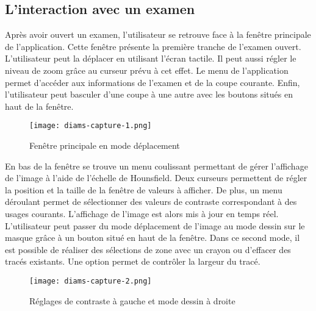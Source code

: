 \subsection{L'interaction avec un examen}

Après avoir ouvert un examen, l'utilisateur se retrouve face à la fenêtre principale de l'application. Cette fenêtre présente la première tranche de l'examen ouvert. L'utilisateur peut la déplacer en utilisant l'écran tactile. Il peut aussi régler le niveau de zoom grâce au curseur prévu à cet effet. 
Le menu de l'application permet d'accéder aux informations de l'examen et de la coupe courante. Enfin, l'utilisateur peut basculer d'une coupe à une autre avec les boutons situés en haut de la fenêtre.\\

\begin{figure}[h]
\begin{center}
	\texttt{[image: diams-capture-1.png]}
\end{center}
	\caption{Fenêtre principale en mode déplacement}
\end{figure}

En bas de la fenêtre se trouve un menu coulissant permettant de gérer l'affichage de l'image à l'aide de l'échelle de Hounsfield. Deux curseurs permettent de régler la position et la taille de la fenêtre de valeurs à afficher. De plus, un menu déroulant permet de sélectionner des valeurs de contraste correspondant à des usages courants. L'affichage de l'image est alors mis à jour en temps réel.\\

L'utilisateur peut passer du mode déplacement de l'image au mode dessin sur le masque grâce à un bouton situé en haut de la fenêtre. Dans ce second mode, il est possible de réaliser des sélections de zone avec un crayon ou d'effacer des tracés existants. Une option permet de contrôler la largeur du tracé.\\

\begin{figure}[h]
\begin{center}
	\texttt{[image: diams-capture-2.png]}
\end{center}
	\caption{Réglages de contraste à gauche et mode dessin à droite}
\end{figure}
